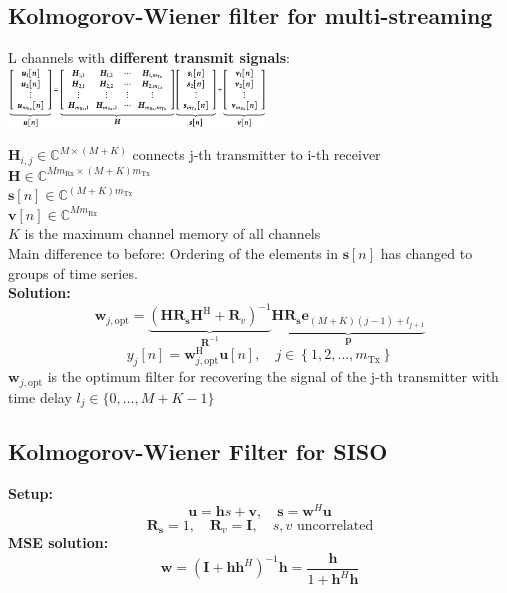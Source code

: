 \documentclass[english]{latex4ei/latex4ei_sheet}
\begin{document}
  

\begin{sectionbox}
  \subsection{Kolmogorov-Wiener filter for multi-streaming}
  L channels with \textbf{different transmit signals}:\\

  \includegraphics[width = 6.8cm]{img/wiener-multi.png}

  $\boldsymbol{H}_{i, j} \in \mathbb{C}^{M \times(M+K)}$ connects j-th transmitter to i-th receiver\\
  $\mathbf{H} \in \mathbb{C}^{M m_{\mathrm{Rx}} \times(M+K) m_{\mathrm{Tx}}}$\\
  $\boldsymbol{s}[n] \in \mathbb{C}^{(M+K) m_{\mathrm{Tx}}}$\\
  $\boldsymbol{v}[n] \in \mathbb{C}^{M m_{\mathrm{Rx}}}$\\
  $K$ is the maximum channel memory of all channels\\

  Main difference to before: Ordering of the elements in $\boldsymbol{s}[n]$ has changed to groups of time series.\\
  
  \textbf{Solution:}\\
  $$\boldsymbol{w}_{j, \mathrm{opt}}=\underbrace{\left(\boldsymbol{H} \boldsymbol{R}_{\boldsymbol{s}} \boldsymbol{H}^{\mathrm{H}}+\boldsymbol{R}_{v}\right)^{-1}}_{\boldsymbol{R}^{-1}} \underbrace{\boldsymbol{H} \boldsymbol{R}_{\boldsymbol{s}} \mathbf{e}_{(M+K)(j-1)+l_{j+1}}}_{\boldsymbol{p}}$$
  $$y_{j}[n]=\boldsymbol{w}_{j, \mathrm{opt}}^{\mathrm{H}} \boldsymbol{u}[n], \quad j \in\left\{1,2, \ldots, m_{\mathrm{Tx}}\right\}$$
  $\boldsymbol{w}_{j, \mathrm{opt}}$ is the optimum filter for recovering the signal of the j-th transmitter with time delay $l_j \in \{0,\dots,M+K-1\}$
\end{sectionbox}

\begin{sectionbox}
  \subsection{Kolmogorov-Wiener Filter for SISO}
  \textbf{Setup:}
  $$\boldsymbol{u} = \boldsymbol{h}s+\boldsymbol{v}, \quad \boldsymbol{s} = \boldsymbol{w}^H\boldsymbol{u}$$
  $$\boldsymbol{R}_{\boldsymbol{s}}=1, \quad \boldsymbol{R}_{v}=\mathbf{I},\quad s,v \text{ uncorrelated}$$
  \textbf{MSE solution:}
  $$\boldsymbol{w} = (\boldsymbol{I} + \boldsymbol{h}\boldsymbol{h}^H)^{-1}\boldsymbol{h} =\frac{\boldsymbol{h}}{1+\boldsymbol{h}^H\boldsymbol{h}}$$
\end{sectionbox}
\end{document}
